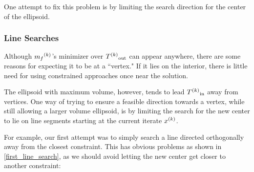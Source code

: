 One attempt to fix this problem is by limiting the search direction for the center of the ellipsoid.


\subsubsection{Line Searches}
Although ${{m}_f}^{(k)}$'s minimizer over ${T^{(k)}}_{\text{out}}$  can appear anywhere, there are some reasons for expecting it to be at a ``vertex."
If it lies on the interior, there is little need for using constrained approaches once near the solution.

The ellipsoid with maximum volume, however, tends to lead ${T^{(k)}}_{\text{in}}$ away from vertices.
One way of trying to ensure a feasible direction towards a vertex, while still allowing a larger volume ellipsoid, is by limiting the search for the new center to lie on line segments starting at the current iterate ${x}^{(k)}$.

For example, our first attempt was to simply search a line directed orthogonally away from the closest constraint.
This has obvious problems as shown in \cref{first_line_search}, as we should avoid letting the new center get closer to another constraint:


